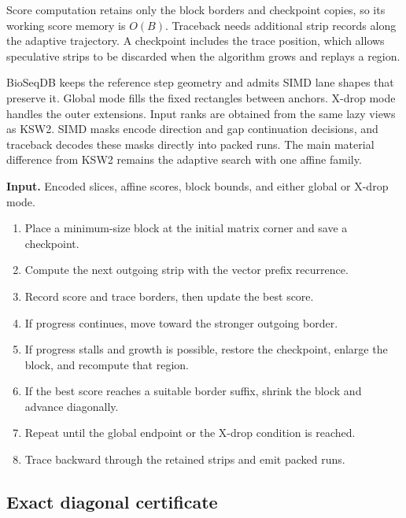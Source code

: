 Score computation retains only the block borders and checkpoint copies, so
its working score memory is \(O(B)\). Traceback needs additional strip records
along the adaptive trajectory. A checkpoint includes the trace position, which
allows speculative strips to be discarded when the algorithm grows and
replays a region.

BioSeqDB keeps the reference step geometry and admits SIMD lane shapes that
preserve it. Global mode fills the fixed rectangles between anchors. X-drop
mode handles the outer extensions. Input ranks are obtained from the same
lazy views as KSW2. SIMD masks encode direction and gap continuation decisions,
and traceback decodes these masks directly into packed runs. The main material
difference from KSW2 remains the adaptive search with one affine family.

\begin{algorithm}[htbp]
\caption{Adaptive block alignment}
\label{alg:adaptive-block-alignment}
\begin{minipage}{\linewidth}
\small
\textbf{Input.} Encoded slices, affine scores, block bounds, and either global
or X-drop mode.
\begin{enumerate}
    \item Place a minimum-size block at the initial matrix corner and save a
          checkpoint.
    \item Compute the next outgoing strip with the vector prefix recurrence.
    \item Record score and trace borders, then update the best score.
    \item If progress continues, move toward the stronger outgoing border.
    \item If progress stalls and growth is possible, restore the checkpoint,
          enlarge the block, and recompute that region.
    \item If the best score reaches a suitable border suffix, shrink the block
          and advance diagonally.
    \item Repeat until the global endpoint or the X-drop condition is reached.
    \item Trace backward through the retained strips and emit packed runs.
\end{enumerate}
\end{minipage}
\end{algorithm}

\subsection{Exact diagonal certificate}
\label{sec:block-diagonal-certificate}

